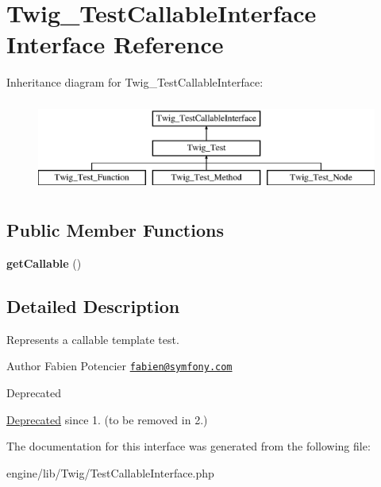 \hypertarget{interface_twig___test_callable_interface}{}\section{Twig\+\_\+\+Test\+Callable\+Interface Interface Reference}
\label{interface_twig___test_callable_interface}
Inheritance diagram for Twig\+\_\+\+Test\+Callable\+Interface\+:\begin{figure}[H]
\begin{center}
\leavevmode
\includegraphics[height=3.000000cm]{interface_twig___test_callable_interface}
\end{center}
\end{figure}
\subsection*{Public Member Functions}
\begin{DoxyCompactItemize}
\item 
\hypertarget{interface_twig___test_callable_interface_a0be839e0782a38a172c386bd963375c9}{}{\bfseries get\+Callable} ()\label{interface_twig___test_callable_interface_a0be839e0782a38a172c386bd963375c9}

\end{DoxyCompactItemize}


\subsection{Detailed Description}
Represents a callable template test.

\begin{DoxyAuthor}{Author}
Fabien Potencier \href{mailto:fabien@symfony.com}{\tt fabien@symfony.\+com} 
\end{DoxyAuthor}
\begin{DoxyRefDesc}{Deprecated}
\item[\hyperlink{deprecated__deprecated000025}{Deprecated}]since 1. (to be removed in 2.) \end{DoxyRefDesc}


The documentation for this interface was generated from the following file\+:\begin{DoxyCompactItemize}
\item 
engine/lib/\+Twig/Test\+Callable\+Interface.\+php\end{DoxyCompactItemize}
